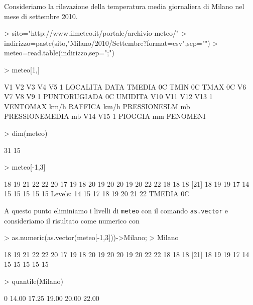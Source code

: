 \documentclass[onecolumn,11pt]{book}
\begin{document}
Consideriamo la rilevazione della temperatura media giornaliera di Milano nel mese di settembre 2010. 
\begin{Schunk}
\begin{Sinput}
> sito="http://www.ilmeteo.it/portale/archivio-meteo/"
> indirizzo=paste(sito,"Milano/2010/Settembre?format=csv",sep="")
> meteo=read.table(indirizzo,sep=";")
\end{Sinput}
\end{Schunk}
\begin{Schunk}
\begin{Sinput}
> meteo[1,]
\end{Sinput}
\begin{Soutput}
        V1   V2           V3         V4         V5
1 LOCALITA DATA TMEDIA \xb0C TMIN \xb0C TMAX \xb0C
                  V6        V7            V8              V9
1 PUNTORUGIADA \xb0C UMIDITA %
            V10          V11             V12               V13
1 VENTOMAX km/h RAFFICA km/h PRESSIONESLM mb PRESSIONEMEDIA mb
         V14      V15
1 PIOGGIA mm FENOMENI
\end{Soutput}
\begin{Sinput}
> dim(meteo)
\end{Sinput}
\begin{Soutput}
[1] 31 15
\end{Soutput}
\begin{Sinput}
> meteo[-1,3]
\end{Sinput}
\begin{Soutput}
 [1] 18 19 21 22 22 20 17 19 18 20 19 20 20 19 20 22 22 18 18 18
[21] 18 19 19 17 14 15 15 15 15 15
Levels: 14 15 17 18 19 20 21 22 TMEDIA \xb0C
\end{Soutput}
\end{Schunk}
A questo punto eliminiamo i livelli di \texttt{meteo} con il comando \texttt{as.vector} e consideriamo il risultato come numerico con
\begin{Schunk}
\begin{Sinput}
> as.numeric(as.vector(meteo[-1,3]))->Milano;
> Milano
\end{Sinput}
\begin{Soutput}
 [1] 18 19 21 22 22 20 17 19 18 20 19 20 20 19 20 22 22 18 18 18
[21] 18 19 19 17 14 15 15 15 15 15
\end{Soutput}
\begin{Sinput}
> quantile(Milano)
\end{Sinput}
\begin{Soutput}
   0%
14.00 17.25 19.00 20.00 22.00 
\end{Soutput}
\end{Schunk}
\end{document}
